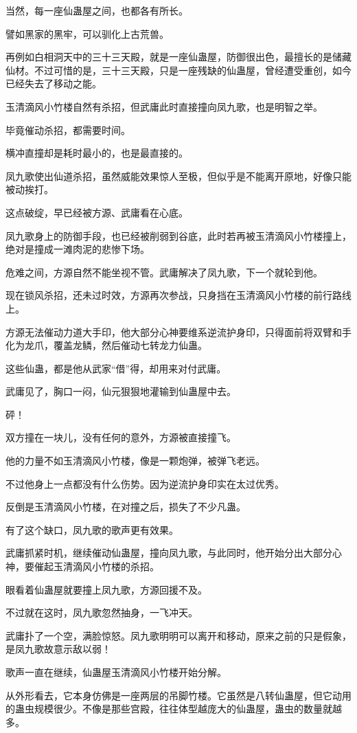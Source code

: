 \begin{this_body}
当然，每一座仙蛊屋之间，也都各有所长。

譬如黑家的黑牢，可以驯化上古荒兽。

再例如白相洞天中的三十三天殿，就是一座仙蛊屋，防御很出色，最擅长的是储藏仙材。不过可惜的是，三十三天殿，只是一座残缺的仙蛊屋，曾经遭受重创，如今已经失去了移动之能。

玉清滴风小竹楼自然有杀招，但武庸此时直接撞向凤九歌，也是明智之举。

毕竟催动杀招，都需要时间。

横冲直撞却是耗时最小的，也是最直接的。

凤九歌使出仙道杀招，虽然威能效果惊人至极，但似乎是不能离开原地，好像只能被动挨打。

这点破绽，早已经被方源、武庸看在心底。

凤九歌身上的防御手段，也已经被削弱到谷底，此时若再被玉清滴风小竹楼撞上，绝对是撞成一滩肉泥的悲惨下场。

危难之间，方源自然不能坐视不管。武庸解决了凤九歌，下一个就轮到他。

现在锁风杀招，还未过时效，方源再次参战，只身挡在玉清滴风小竹楼的前行路线上。

方源无法催动力道大手印，他大部分心神要维系逆流护身印，只得面前将双臂和手化为龙爪，覆盖龙鳞，然后催动七转龙力仙蛊。

这些仙蛊，都是他从武家“借”得，却用来对付武庸。

武庸见了，胸口一闷，仙元狠狠地灌输到仙蛊屋中去。

砰！

双方撞在一块儿，没有任何的意外，方源被直接撞飞。

他的力量不如玉清滴风小竹楼，像是一颗炮弹，被弹飞老远。

不过他身上一点都没有什么伤势。因为逆流护身印实在太过优秀。

反倒是玉清滴风小竹楼，在对撞之后，损失了不少凡蛊。

有了这个缺口，凤九歌的歌声更有效果。

武庸抓紧时机，继续催动仙蛊屋，撞向凤九歌，与此同时，他开始分出大部分心神，要催起玉清滴风小竹楼的杀招。

眼看着仙蛊屋就要撞上凤九歌，方源回援不及。

不过就在这时，凤九歌忽然抽身，一飞冲天。

武庸扑了一个空，满脸惊怒。凤九歌明明可以离开和移动，原来之前的只是假象，是凤九歌故意示敌以弱！

歌声一直在继续，仙蛊屋玉清滴风小竹楼开始分解。

从外形看去，它本身仿佛是一座两层的吊脚竹楼。它虽然是八转仙蛊屋，但它动用的蛊虫规模很少。不像是那些宫殿，往往体型越庞大的仙蛊屋，蛊虫的数量就越多。


\end{this_body}
